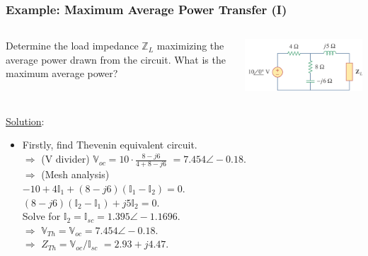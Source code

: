 \documentclass{beamer}
\begin{document}
\begin{frame}[fragile]
\frametitle{Example: Maximum Average Power Transfer (I)}

\begin{columns}[c]

Determine the load impedance $\mathbb{Z}_L$ maximizing the average power drawn from the circuit.
What is the maximum average power?

\includegraphics[width=\textwidth]{src/example_max1.png}
\end{columns}

\underline{Solution}:
\begin{itemize}
\item Firstly, find Thevenin equivalent circuit.
\\
$\Rightarrow$ (V divider)
$\mathbb{V}_{oc} = 10 \cdot \frac{8 - j6}{4 + 8 - j6}$
$=7.454 \angle -0.18$.
\\
$\Rightarrow$ (Mesh analysis)\\
$-10 + 4 \mathbb{I}_1 + (8 - j6)(\mathbb{I}_1 - \mathbb{I}_2) = 0$.
\\
$(8 -j6)(\mathbb{I}_2 - \mathbb{I}_1) + j5 \mathbb{I}_2 = 0$.
\\
Solve for $\mathbb{I}_2 = \mathbb{I}_{sc} = 1.395 \angle -1.1696$.
\\
$\Rightarrow$
$\mathbb{V}_{Th} = \mathbb{V}_{oc} = 7.454 \angle -0.18$.
\\
$\Rightarrow$
$Z_{Th} = \mathbb{V}_{oc}/\mathbb{I}_{sc}$
$= 2.93+j4.47$.


\end{itemize}


\end{frame}
\end{document}
